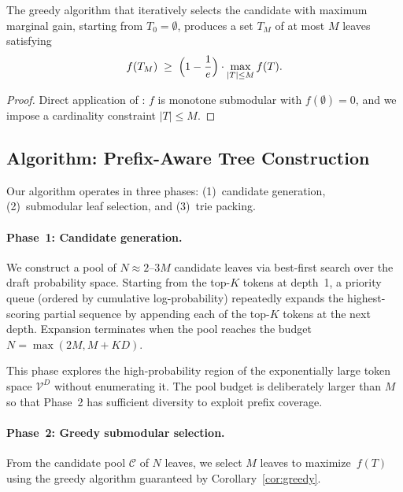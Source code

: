 \begin{corollary}
\label{cor:greedy}
The greedy algorithm that iteratively selects the candidate with maximum
marginal gain, starting from $T_0 = \emptyset$, produces a set $T_M$ of
at most $M$ leaves satisfying
\[
  f(T_M) \;\geq\; \Bigl(1 - \frac{1}{e}\Bigr) \cdot
  \max_{|T| \leq M} f(T).
\]
\end{corollary}

\begin{proof}
Direct application of \citet{nemhauser1978}: $f$ is monotone
submodular with $f(\emptyset) = 0$, and we impose a cardinality
constraint $|T| \leq M$.
\end{proof}

\subsection{Algorithm: Prefix-Aware Tree Construction}
\label{sec:algorithm}

Our algorithm operates in three phases: (1)~candidate generation,
(2)~submodular leaf selection, and (3)~trie packing.

\paragraph{Phase~1: Candidate generation.}
We construct a pool of $N \approx 2$--$3M$ candidate leaves via
best-first search over the draft probability space.  Starting from the
top-$K$ tokens at depth~1, a priority queue (ordered by cumulative
log-probability) repeatedly expands the highest-scoring partial sequence
by appending each of the top-$K$ tokens at the next depth.  Expansion
terminates when the pool reaches the budget $N = \max(2M, M + KD)$.

This phase explores the high-probability region of the exponentially
large token space $\mathcal{V}^D$ without enumerating it.  The pool
budget is deliberately larger than $M$ so that Phase~2 has sufficient
diversity to exploit prefix coverage.

\paragraph{Phase~2: Greedy submodular selection.}
From the candidate pool $\mathcal{C}$ of $N$ leaves, we select $M$
leaves to maximize~$f(T)$ using the greedy algorithm guaranteed by
Corollary~\ref{cor:greedy}.

